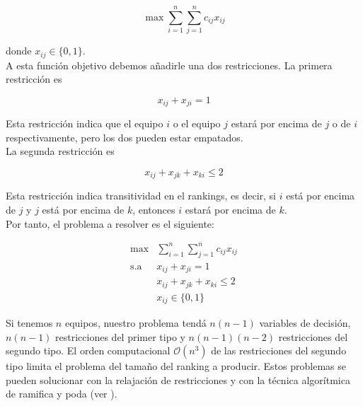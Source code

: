 \begin{equation}
\max \sum_{i=1}^{n} \sum_{j=1}^{n} c_{ij} x_{ij}
\end{equation}

donde $x_{ij} \in \{0,1\}$.\\

A esta función objetivo debemos añadirle una dos restricciones. La primera restricción es

\begin{equation}
x_{ij} + x_{ji} = 1
\end{equation}

Esta restricción indica que el equipo $i$ o el equipo $j$ estará por encima de $j$ o de $i$ respectivamente, pero los dos pueden estar empatados.\\

La segunda restricción es 

\begin{equation}
x_{ij} + x_{jk} + x_{ki} \leq 2
\end{equation}

Esta restricción indica transitividad en el rankings, es decir, si $i$ está por encima de $j$ y $j$ está por encima de $k$, entonces $i$ estará por encima de $k$.\\

Por tanto, el problema a resolver es el siguiente:

\begin{equation}
\begin{array}{rl}
\max         & \sum\limits_{i=1}^{n} \sum\limits_{j=1}^{n} c_{ij} x_{ij}\\
\mathrm{s.a} & x_{ij} + x_{ji} = 1\\
             & x_{ij} + x_{jk} + x_{ki} \leq 2\\
             & x_{ij} \in \{0,1\}
\end{array}
\end{equation}

Si tenemos $n$ equipos, nuestro problema tendá $n(n-1)$ variables de decisión, $n(n-1)$ restricciones del primer tipo y $n(n-1)(n-2)$ restricciones del segundo tipo. El orden computacional $\mathcal{O}(n^3)$ de las restricciones del segundo tipo limita el problema del tamaño del ranking a producir. Estos problemas se pueden solucionar con la relajación de restricciones y con la técnica algorítmica de ramifica y poda (ver \cite[pág 190-192]{langville2012s}).

